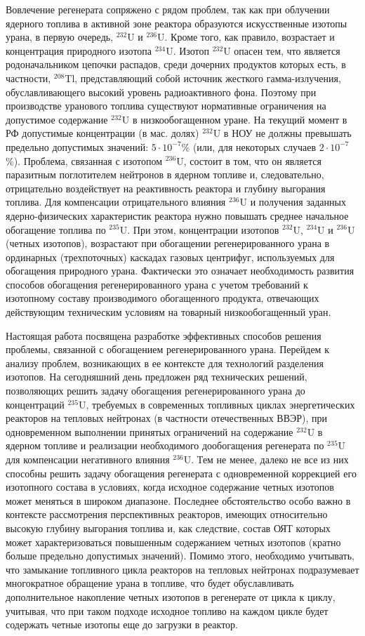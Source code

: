Вовлечение регенерата сопряжено с рядом проблем, так как при облучении ядерного топлива в активной зоне реактора образуются искусственные изотопы урана, в первую очередь, $^{232}$U и $^{236}$U. Кроме того, как правило, возрастает и концентрация природного изотопа $^{234}$U. Изотоп $^{232}$U опасен тем, что является родоначальником цепочки распадов, среди дочерних продуктов которых есть,  в частности, $^{208}$Tl, представляющий собой источник жесткого гамма-излучения, обуславливающего высокий уровень радиоактивного фона. Поэтому при производстве уранового топлива существуют нормативные ограничения на допустимое содержание $^{232}$U в низкообогащенном уране. На текущий момент в РФ допустимые концентрации (в мас. долях) $^{232}$U в НОУ не должны превышать предельно допустимых значений: $5\cdot10^{-7}$\% (или, для некоторых случаев $2\cdot10^{-7}$\%). Проблема, связанная с изотопом $^{236}$U, состоит в том, что он является паразитным поглотителем нейтронов в ядерном топливе и, следовательно, отрицательно воздействует на реактивность реактора и глубину выгорания топлива. Для компенсации отрицательного влияния $^{236}$U и получения заданных ядерно-физических характеристик реактора нужно повышать среднее начальное обогащение топлива по $^{235}$U.  При этом, концентрации изотопов $^{232}$U, $^{234}$U и $^{236}$U (четных изотопов), возрастают при обогащении регенерированного урана в ординарных (трехпоточных) каскадах газовых центрифуг, используемых для обогащения природного урана. Фактически это означает необходимость развития способов обогащения регенерированного урана с учетом требований к изотопному составу производимого обогащенного продукта, отвечающих действующим техническим условиям на товарный низкообогащенный уран.

Настоящая работа посвящена разработке эффективных способов решения проблемы, связанной с обогащением регенерированного урана.
Перейдем к анализу проблем, возникающих в ее контексте для технологий разделения изотопов. На сегодняшний день предложен ряд технических решений, позволяющих решить задачу обогащения регенерированного урана до концентраций $^{235}$U, требуемых в современных топливных циклах энергетических реакторов на тепловых нейтронах (в частности отечественных ВВЭР), при одновременном выполнении принятых ограничений на содержание $^{232}$U в ядерном топливе и реализации необходимого дообогащения регенерата по $^{235}$U для компенсации негативного влияния $^{236}$U. Тем не менее, далеко не все из них способны решить задачу обогащения регенерата с одновременной коррекцией его изотопного состава в условиях, когда исходное содержание четных изотопов может меняться в широком диапазоне. Последнее обстоятельство особо важно в контексте рассмотрения перспективных реакторов, имеющих относительно высокую глубину выгорания топлива и, как следствие, состав ОЯТ которых может характеризоваться повышенным содержанием четных изотопов (кратно больше предельно допустимых значений). Помимо этого, необходимо учитывать, что замыкание топливного цикла реакторов на тепловых нейтронах подразумевает многократное обращение урана в топливе, что будет обуславливать дополнительное накопление четных изотопов в регенерате от цикла к циклу, учитывая, что при таком подходе исходное топливо на каждом цикле будет содержать четные изотопы еще до загрузки в реактор.

